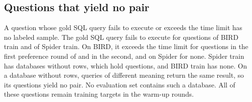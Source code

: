 \subsection{Questions that yield no pair}

A question whose gold SQL query
fails to execute or exceeds the time limit has no labeled sample. The
gold SQL query fails to execute for 
questions of BIRD train and  of Spider
train. On BIRD, it exceeds the time limit for
 questions in the first preference
round of \method{} and  in the
second, and on Spider for none. Spider train has
 databases without rows, which hold
 questions, and BIRD train has none. On a
database without rows, queries of different meaning return the same
result, so its questions yield no pair. No evaluation set contains such
a database. All of these questions remain training targets in the
warm-up rounds.
